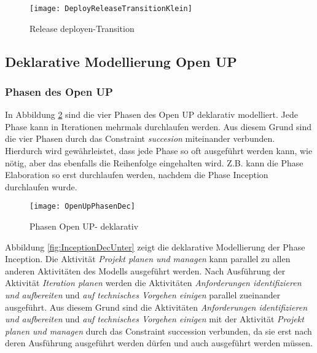 \begin{figure}[!htbp]
\begin{center}
  \texttt{[image: DeployReleaseTransitionKlein]} %
  \caption{Release deployen-Transition}
  \label{fig:DeployReleaseTransitionKlein}
\end{center}
\end{figure}



\clearpage

\subsection{Deklarative Modellierung Open UP}




\subsubsection{Phasen des Open UP}


In Abbildung \ref{fig:OpenUpPhasenDec} sind die vier Phasen des Open UP deklarativ modelliert. Jede Phase kann in Iterationen mehrmals durchlaufen werden. Aus diesem Grund sind die vier Phasen durch das Constraint \textit{succesion} miteinander verbunden. Hierdurch wird gewährleistet, dass jede Phase so oft ausgeführt werden kann, wie nötig, aber das ebenfalls die Reihenfolge eingehalten wird. Z.B. kann die Phase Elaboration so erst durchlaufen werden, nachdem die Phase Inception durchlaufen wurde.
\begin{figure}[htp]
\begin{center}
  \texttt{[image: OpenUpPhasenDec]} %
  \caption{Phasen Open UP- deklarativ}
  \label{fig:OpenUpPhasenDec}
\end{center}
\end{figure}




Abbildung \ref{fig:InceptionDecUnter} zeigt die deklarative Modellierung der Phase Inception. Die Aktivität \textit{Projekt planen und managen} kann parallel zu allen anderen Aktivitäten des Modells ausgeführt werden.\newline
Nach Ausführung der Aktivität \textit{Iteration planen} werden die Aktivitäten \textit{Anforderungen identifizieren und aufbereiten} und \textit{auf technisches Vorgehen einigen} parallel zueinander ausgeführt. Aus diesem Grund sind die Aktivitäten \textit{Anforderungen identifizieren und aufbereiten} und \textit{auf technisches Vorgehen einigen} mit der Aktivität  \textit{Projekt planen und managen} durch das Constraint succession verbunden, da sie erst nach deren Ausführung ausgeführt werden dürfen und auch ausgeführt werden müssen. \newline

